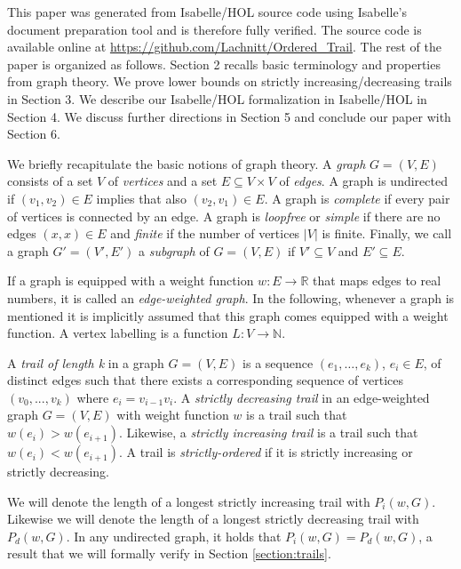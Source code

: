 \begin{isabellebody}
\begin{isamarkuptext}
This paper was generated from Isabelle/HOL source code using Isabelle's document preparation tool 
and is therefore fully verified. The source code is available
online at \url{https://github.com/Lachnitt/Ordered_Trail}. The rest of the paper is organized as follows.
Section 2 recalls basic terminology and properties from graph theory. 
We prove lower bounds on strictly increasing/decreasing trails in Section 3. We describe our Isabelle/HOL 
formalization in Isabelle/HOL in Section 4. We discuss further directions in Section 5 and conclude our paper with Section 6.%
\end{isamarkuptext}\isamarkuptrue%
%
\isadelimdocument
%
\endisadelimdocument
%
\isatagdocument
%
\isamarkuptrue%
%
\endisatagdocument
{\isafolddocument}%
%
\isadelimdocument
%
\endisadelimdocument
%
\begin{isamarkuptext}%
\label{section:Prelim}
We briefly recapitulate the basic notions of graph theory. A {\em graph} $G = (V,E)$ consists of
a set $V$ of {\em vertices} and a set $E \subseteq V \times V$ of {\em edges}. A graph is undirected 
if $(v_1,v_2)\in E$ implies that also $(v_2,v_1)\in E$. A graph is {\em complete}
 if every pair of vertices is connected by an edge. A graph is {\em loopfree} or {\em simple} if there are no edges $(x,x)\in E$ and 
{\em finite} if the number of vertices $|V|$ is finite. Finally, we call 
a graph $G'=(V',E')$ a {\em subgraph} of $G = (V,E) $ if $V' \subseteq V$ and $E' \subseteq E$.

If a graph is equipped with a
 weight function $w: E \rightarrow \mathbb{R}$ that maps edges to real numbers, it is called 
 an {\em edge-weighted graph}. In the following, whenever a graph is mentioned it is implicitly assumed
that this graph comes equipped with a weight function. A vertex labelling is a function $L: V \rightarrow \mathbb{N}$.

A {\em trail of length k} in a graph $G = (V,E)$ is a sequence $(e_1,\ldots,e_k)$, $e_i \in E$, of distinct edges such that
 there exists a corresponding sequence of vertices $(v_0,...,v_k)$ where $e_i = v_{i-1}v_i$. 
A {\em strictly decreasing trail} in an edge-weighted graph $G = (V,E)$ with weight function $w$
is a trail such that $w (e_i) > w (e_{i+1})$. Likewise, a {\em strictly increasing trail} is a trail such that $w (e_i) < w (e_{i+1})$.
A trail is {\em strictly-ordered} if it is strictly increasing or strictly decreasing.

We will denote the length of a longest strictly increasing trail with $P_i(w,G)$. Likewise we will denote the length
of a longest strictly decreasing trail with $P_d(w,G)$. In any undirected graph, it holds that $P_i(w,G) = P_d(w,G)$, 
a result that we will formally verify in Section \ref{section:trails}. 


\end{isamarkuptext}
\end{isabellebody}

